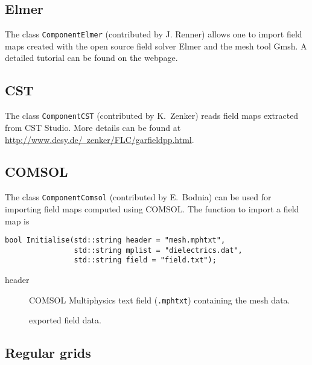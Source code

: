 \subsection{Elmer}

The class \texttt{ComponentElmer} (contributed by J. Renner) allows one to import 
field maps created with the open source field solver Elmer and the 
mesh tool Gmsh. A detailed tutorial can be found on the webpage. 

\subsection{CST}

The class \texttt{ComponentCST} (contributed by K.~Zenker) reads field maps 
extracted from CST Studio. More details can be found at 
\href{http://www.desy.de/~zenker/FLC/garfieldpp.html}{http://www.desy.de/~zenker/FLC/garfieldpp.html}.

\subsection{COMSOL}

The class \texttt{ComponentComsol} (contributed by E.~Bodnia) can be used for 
importing field maps computed using COMSOL.
The function to import a field map is 
\begin{lstlisting}
bool Initialise(std::string header = "mesh.mphtxt",
                std::string mplist = "dielectrics.dat",
                std::string field = "field.txt");
\end{lstlisting}
\begin{description}
  \item[header] COMSOL Multiphysics text field (\texttt{.mphtxt}) containing the mesh data.
  \item[] exported field data. 
\end{description}

\subsection{Regular grids}

